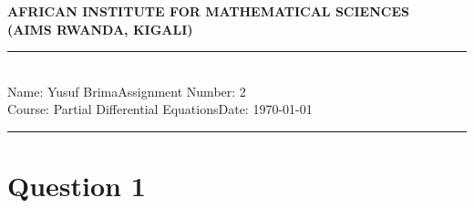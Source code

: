 \documentclass[12pt,a4paper]{article}
\newcommand{\student}{Yusuf Brima}
\newcommand{\course}{Partial Differential Equations}
\newcommand{\assignment}{2}
\begin{document}
\thispagestyle{empty}
\begin{center}
\textbf{AFRICAN INSTITUTE FOR MATHEMATICAL SCIENCES \\[0.5cm]
(AIMS RWANDA, KIGALI)}
\vspace{1.0cm}
\end{center}

\noindent
\rule{17cm}{0.2cm}\\[0.3cm]
Name: \student \hfill Assignment Number: \assignment\\[0.1cm]
Course: \course \hfill Date: \today\\
\rule{17cm}{0.05cm}
\vspace{1.0cm}
\section*{Question 1}
\end{document}
